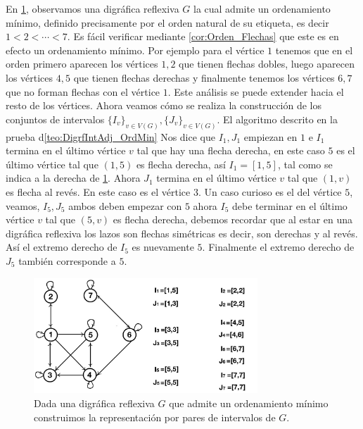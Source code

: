 En \cref{fig:MinOrdToIntGrph}, observamos una digr\'afica reflexiva $G$ la cual
admite un ordenamiento mínimo, definido precisamente por el orden natural de su
etiqueta, es decir $1<2< \cdots <7$. Es f\'acil verificar mediante
\cref{cor:Orden_Flechas} que este es en efecto un ordenamiento mínimo. Por
ejemplo para el v\'ertice $1$ tenemos que en el orden primero aparecen los
v\'ertices $1,2$ que tienen flechas dobles, luego aparecen los v\'ertices $4,5$
que tienen flechas derechas y finalmente tenemos los v\'ertices $6,7$ que no
forman flechas con el v\'ertice $1$. Este an\'alisis se puede extender hacia el
resto de los v\'ertices. Ahora veamos c\'omo se realiza la construcci\'on de los
conjuntos de intervalos $\{I_v\}_{v\in V(G)}, \{J_v\}_{v\in V(G)}$. El algoritmo
descrito en la prueba  d\cref{teo:DigrfIntAdj_OrdMin} Nos dice que $I_1, J_1$
empiezan en $1$ e $I_1$ termina en el último v\'ertice $v$ tal que hay una
flecha derecha, en este caso $5$ es el último v\'ertice tal que $(1,5)$ es
flecha derecha, así $I_1=[1,5]$, tal como se indica a la derecha de
\cref{fig:MinOrdToIntGrph}. Ahora $J_1$ termina en el último v\'ertice $v$ tal
que $(1,v)$ es flecha al rev\'es. En este caso es el v\'ertice $3$. Un caso
curioso es el del v\'ertice $5$, veamos, $I_5,J_5$ ambos deben empezar con $5$
ahora $I_5$ debe terminar en el último v\'ertice $v$ tal que $(5,v)$ es flecha
derecha, debemos recordar que al estar en una digr\'afica reflexiva los lazos
son flechas sim\'etricas es decir, son derechas y al rev\'es. Así el extremo
derecho de $I_5$ es nuevamente $5$. Finalmente el extremo derecho de $J_5$
tambi\'en corresponde a $5$. 


\begin{figure}[H]
  \centering
  \includegraphics[width=0.75\textwidth]{recursos/capturas/MinOrdToIntGrph.jpg}
  \caption{Dada una digr\'afica reflexiva $G$ que admite un ordenamiento mínimo construimos la representaci\'on por pares de intervalos de $G$.}
  \label{fig:MinOrdToIntGrph}
\end{figure}

